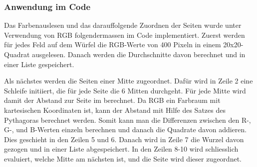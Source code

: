 \documentclass[a4paper, 12pt]{article}
\begin{document}
\subsubsection{Anwendung im Code}
Das Farbenauslesen und das darauffolgende Zuordnen der Seiten wurde unter Verwendung von RGB folgendermassen im Code implementiert.
\newline
Zuerst werden für jedes Feld auf dem Würfel die RGB-Werte von 400 Pixeln in einem 20x20-Quadrat ausgelesen. Danach werden die Durchschnitte davon berechnet und in einer Liste gespeichert.

Als nächstes werden die Seiten einer Mitte zugeordnet. Dafür wird in Zeile 2 eine Schleife initiiert, die für jede Seite die 6 Mitten durchgeht. Für jede Mitte wird damit der Abstand zur Seite im berechnet.
\newline
Da RGB ein Farbraum mit kartesischen Koordinaten ist, kann der Abstand mit Hilfe des Satzes des Pythagoras berechnet werden. Somit kann man die Differenzen zwischen den R-, G-, und B-Werten einzeln berechnen und danach die Quadrate davon addieren. Dies geschieht in den Zeilen 5 und 6. Danach wird in Zeile 7 die Wurzel davon gezogen und in einer Liste abgespeichert.
\newline
In den Zeilen 8-10 wird schliesslich evaluiert, welche Mitte am nächsten ist, und die Seite wird dieser zugeordnet. 

\end{document}
